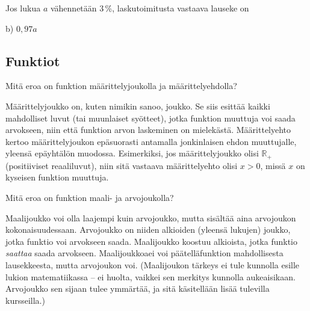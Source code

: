 %
%	
%
%
%	
%
%
%	

\begin{tehtava}
Jos lukua $a$ vähennetään $3$\,\%, laskutoimitusta vastaava lauseke on
	\begin{vastaus}
b) $0,97a$
	\end{vastaus}
\end{tehtava}

\subsection*{Funktiot}

\begin{tehtava}
Mitä eroa on funktion määrittelyjoukolla ja määrittelyehdolla?
\begin{vastaus}
Määrittelyjoukko on, kuten nimikin sanoo, joukko. Se siis esittää kaikki mahdolliset luvut (tai muunlaiset syötteet), jotka funktion muuttuja voi saada arvokseen, niin että funktion arvon laskeminen on mielekästä. Määrittelyehto kertoo määrittelyjoukon epäsuorasti antamalla jonkinlaisen ehdon muuttujalle, yleensä epäyhtälön muodossa. Esimerkiksi, jos määrittelyjoukko olisi $\mathbb{R}_+$ (positiiviset reaaliluvut), niin sitä vastaava määrittelyehto olisi $x>0$, missä $x$ on kyseisen funktion muuttuja.
\end{vastaus}
\end{tehtava}

\begin{tehtava}
Mitä eroa on funktion maali- ja arvojoukolla?
	\begin{vastaus}
Maalijoukko voi olla laajempi kuin arvojoukko, mutta sisältää aina arvojoukon kokonaisuudessaan. Arvojoukko on niiden alkioiden (yleensä lukujen) joukko, jotka funktio voi arvokseen saada. Maalijoukko koostuu alkioista, jotka funktio \textit{saattaa} saada arvokseen. Maalijoukkoaei voi päätelläfunktion mahdollisesta lausekkeesta, mutta arvojoukon voi. (Maalijoukon tärkeys ei tule kunnolla esille lukion matematiikassa -- ei huolta, vaikkei sen merkitys kunnolla aukeaisikaan. Arvojoukko sen sijaan tulee ymmärtää, ja sitä käsitellään lisää tulevilla kursseilla.)
	\end{vastaus}
\end{tehtava}

